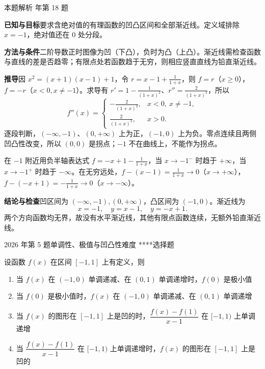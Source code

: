 \documentclass[UTF8,zihao=-4,fontset=fandol]{ctexart}
\newenvironment{abcd}{\begin{enumerate}[label=\textup{(\Alph*)},leftmargin=2.3em,itemsep=1pt,topsep=4pt,parsep=1pt]}{\end{enumerate}}
\newcommand{\choices}[4]{%
  \begin{abcd}
    \item #1
    \item #2
    \item #3
    \item #4
  \end{abcd}}
\newcounter{BankQuestion}
\newcommand{\QuestionPage}[7]{%
  \stepcounter{BankQuestion}%
  \par\noindent\begin{minipage}{\linewidth}
  \raggedright
  {\small\textcolor{black!60}{#3\quad #5\quad 难度 #7}\hfill\textcolor{accent}{#2}}\par\smallskip}
\newcommand{\QuestionEnd}{\end{minipage}\par\medskip}
\newcommand{\QuestionPage}[7]{%
  \clearpage
  \stepcounter{BankQuestion}%
  {\small\textcolor{accent}{#1\hfill #2}}\par\medskip
  {\small\textcolor{black!60}{#3\quad #5\quad 难度 #7\hfill \arabic{BankQuestion} / 234}}\par\vspace{9bp}}
\newcommand{\QuestionEnd}{}
\newenvironment{QuestionSolution}[1]{%
  \clearpage
  {\small\textcolor{black!60}{本题解析\quad #1}}\par\medskip
}{\par\clearpage}
\begin{document}
\begin{QuestionSolution}{2021 年第 18 题}
\textbf{已知与目标}\quad 要求含绝对值的有理函数的凹凸区间和全部渐近线。定义域排除 \(x=-1\)，绝对值还在 \(0\) 处分段。

\textbf{方法与条件}\quad 二阶导数正时图像为凹（下凸），负时为凸（上凸）。渐近线需检查函数与直线的差是否趋零；有限点处若函数趋于无穷，则相应竖直直线为铅直渐近线。

\textbf{推导}\quad 因 \(x^2=(x+1)(x-1)+1\)，令 \(r=x-1+\frac1{1+x}\)，则 \(f=r\)（\(x\ge0\)），\(f=-r\)（\(x<0,x\ne-1\)）。求导有 \(r'=1-\frac1{(1+x)^2}\)、\(r''=\frac2{(1+x)^3}\)，所以
\[
f''(x)=\begin{cases}-\frac2{(1+x)^3},&x<0,\ x\ne-1,\\[2pt]\frac2{(1+x)^3},&x>0.\end{cases}
\]
逐段判断，\((-\infty,-1)\)、\((0,+\infty)\) 上为正，\((-1,0)\) 上为负。零点连续且两侧凹凸性改变，所以 \((0,0)\) 是拐点；\(-1\) 不在曲线上，不能作为拐点。

在 \(-1\) 附近用负半轴表达式 \(f=-x+1-\frac1{1+x}\)，当 \(x\to-1^-\) 时趋于 \(+\infty\)，当 \(x\to-1^+\) 时趋于 \(-\infty\)。在无穷远处，\(f-(x-1)=\frac1{1+x}\to0\)（\(x\to+\infty\)），\(f-(-x+1)=-\frac1{1+x}\to0\)（\(x\to-\infty\)）。

\textbf{结论与检查}\quad 凹区间为 \(\boxed{(-\infty,-1),(0,+\infty)}\)，凸区间为 \(\boxed{(-1,0)}\)。渐近线为
\[\boxed{x=-1,\quad y=x-1,\quad y=-x+1}.\]
两个方向函数均无界，故没有水平渐近线，其他有限点函数连续，无额外铅直渐近线。
\end{QuestionSolution}

\QuestionPage{2.6 函数性态的研究}{选择题}{2026 年第 5 题}{1}{单调性、极值与凹凸性}{116 / 234}{****}
设函数 \(f(x)\) 在区间 \([-1,1]\) 上有定义，则
\choices{当 \(f(x)\) 在 \((-1,0)\) 单调递减、在 \((0,1)\) 单调递增时，\(f(0)\) 是极小值}{当 \(f(0)\) 是极小值时，\(f(x)\) 在 \((-1,0)\) 单调递减、在 \((0,1)\) 单调递增}{当 \(f(x)\) 的图形在 \([-1,1]\) 上是凹的时，\(\dfrac{f(x)-f(1)}{x-1}\) 在 \([-1,1)\) 上单调递增}{当 \(\dfrac{f(x)-f(1)}{x-1}\) 在 \([-1,1)\) 上单调递增时，\(f(x)\) 的图形在 \([-1,1]\) 上是凹的}
\QuestionEnd
\end{document}

